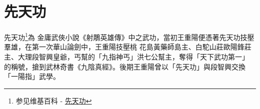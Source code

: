 \chapter{先天功}
先天功\footnote{参见维基百科 - \href{http://zh.wikipedia.org/wiki/\%E5\%85\%88\%E5\%A4\%A9\%E5\%8A\%9F}{先天功}}為
金庸武俠小說《射鵰英雄傳》中之武功，當初王重陽便憑著先天功技壓羣雄，在第一次華山論劍中，王重陽技壓桃
花島黃藥師島主、白駝山莊歐陽鋒莊主、大理段智興皇爺，丐幫的「九指神丐」洪七公幫主，奪得「天下武功第一」
的稱號，搶到武林奇書《九陰真經》。後期王重陽曾以「先天功」與段智興交換「一陽指」武學。

